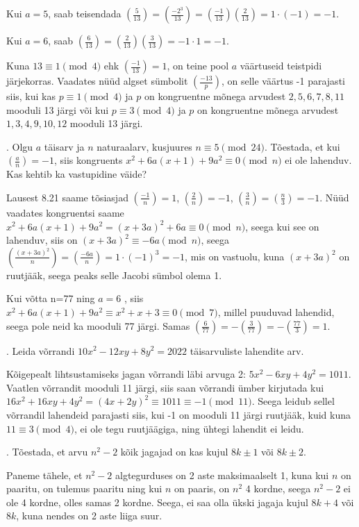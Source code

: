 \documentclass[a4paper, 10pt]{article}
\newcommand{\leg}[2]{\left(\frac{#1}{#2}\right)}
\begin{document}
Kui $a=5$, saab teisendada $\leg{5}{13}=\leg{-2^3}{13}=\leg{-1}{13}\leg{2}{13}=1\cdot(-1)=-1$.

Kui $a=6$, saab $\leg{6}{13}=\leg{2}{13}\leg{3}{13}=-1\cdot1=-1$.

Kuna $13\equiv1\pmod4$ ehk $\leg{-1}{13}=1$, on teine pool $a$ väärtuseid teistpidi järjekorras. Vaadates nüüd algset sümbolit $\leg{-13}{p}$, on selle väärtus -1 parajasti siis, kui kas $p\equiv1\pmod4$ ja $p$ on kongruentne mõnega arvudest $2,5,6,7,8,11$ mooduli 13 järgi või kui $p\equiv3\pmod4$ ja $p$ on kongruentne mõnega arvudest $1,3,4,9,10,12$ mooduli 13 järgi.
\bigskip

. Olgu $a$ täisarv ja $n$ naturaalarv, kusjuures $n\equiv 5\pmod{24}$. Tõestada, et kui $\left(\frac{a}{n} \right)=-1$, siis kongruents $x^2+6a(x+1)+9a^2\equiv 0\pmod n$ ei ole lahenduv. Kas kehtib ka vastupidine väide?

\bigskip
Lausest 8.21 saame tõsiasjad $\left(\frac{-1}{n} \right)=1$, $\left(\frac{2}{n} \right)=-1$, $\left(\frac{3}{n} \right)=\left(\frac{n}{3} \right)=-1$. Nüüd vaadates kongruentsi saame $x^2+6a(x+1)+9a^2=(x+3a)^2+6a\equiv0\pmod{n}$, seega kui see on lahenduv, siis on $(x+3a)^2\equiv-6a\pmod{n}$, seega $\left(\frac{(x+3a)^2}{n} \right)=\left(\frac{-6a}{n} \right)=1\cdot(-1)^3=-1$, mis on vastuolu, kuna $(x+3a)^2$ on ruutjääk, seega peaks selle Jacobi sümbol olema 1. 

Kui võtta n=77 ning $a=6$ , siis $x^2+6a(x+1)+9a^2\equiv x^2+x+3\equiv0\pmod{7}$, millel puuduvad lahendid, seega pole neid ka mooduli 77 järgi. Samas $\left(\frac{6}{77} \right)=-\left(\frac{3}{77} \right)=-\left(\frac{77}{3} \right)=1$.

\bigskip
\pagebreak

. Leida võrrandi $10x^2-12xy+8y^2 = 2022$ täisarvuliste lahendite arv. 

\bigskip
Kõigepealt lihtsustamiseks jagan võrrandi läbi arvuga 2: $5x^2-6xy+4y^2 = 1011$. Vaatlen võrrandit mooduli 11 järgi, siis saan võrrandi ümber kirjutada kui \mbox{$16x^2+16xy+4y^2=(4x+2y)^2 \equiv 1011\equiv-1\pmod {11}$}. Seega leidub sellel võrrandil lahendeid parajasti siis, kui -1 on mooduli 11 järgi ruutjääk, kuid kuna $11\equiv3\pmod4$, ei ole tegu ruutjäägiga, ning ühtegi lahendit ei leidu.
\bigskip

. Tõestada, et arvu $n^2-2$ kõik jagajad on kas kujul $8k\pm1$ või $8k\pm2$. 

\bigskip
Paneme tähele, et $n^2-2$ algtegurduses on 2 aste maksimaalselt 1, kuna kui $n$ on paaritu, on tulemus paaritu ning kui $n$ on paaris, on $n^2$ 4 kordne, seega $n^2-2$ ei ole 4 kordne, olles samas 2 kordne. Seega, ei saa olla ükski jagaja kujul $8k+4$ või $8k$, kuna nendes on 2 aste liiga suur.
\end{document}
